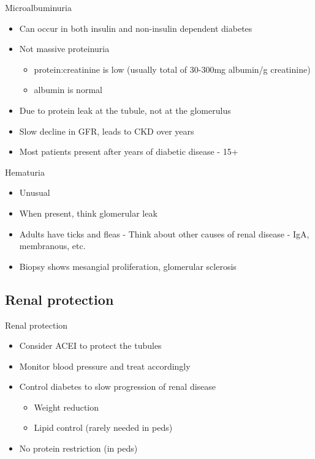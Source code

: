 \begin{frame}{Microalbuminuria}

\begin{itemize}
\itemsep1pt\parskip0pt
\item
  Can occur in both insulin and non-insulin dependent diabetes
\item
  Not massive proteinuria

  \begin{itemize}
  \itemsep1pt\parskip0pt
  \item
    protein:creatinine is low (usually total of 30-300mg albumin/g
    creatinine)
  \item
    albumin is normal
  \end{itemize}
\item
  Due to protein leak at the tubule, not at the glomerulus
\item
  Slow decline in GFR, leads to CKD over years
\item
  Most patients present after years of diabetic disease - 15+
\end{itemize}

\end{frame}

\begin{frame}{Hematuria}

\begin{itemize}
\itemsep1pt\parskip0pt
\item
  Unusual
\item
  When present, think glomerular leak
\item
  Adults have ticks and fleas - Think about other causes of renal
  disease - IgA, membranous, etc.
\item
  Biopsy shows mesangial proliferation, glomerular sclerosis
\end{itemize}

\end{frame}

\subsection{Renal protection}\label{renal-protection}

\begin{frame}{Renal protection}

\begin{itemize}
\itemsep1pt\parskip0pt
\item
  Consider ACEI to protect the tubules
\item
  Monitor blood pressure and treat accordingly
\item
  Control diabetes to slow progression of renal disease

  \begin{itemize}
  \itemsep1pt\parskip0pt
  \item
    Weight reduction
  \item
    Lipid control (rarely needed in peds)
  \end{itemize}
\item
  No protein restriction (in peds)
\end{itemize}

\end{frame}

